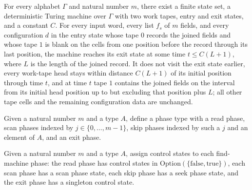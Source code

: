 \begin{theorem}
\label{Turing.exists_fieldsCopyTM}
\leanok
{}
For every alphabet $\Gamma$ and natural number $m$, there exist a finite state set, a
deterministic Turing machine over $\Gamma$ with two work tapes, entry and exit states,
and a constant $C$. For every input word, every list $f_s$ of $m$ fields, and every
configuration $d$ in the entry state whose tape $0$ records the joined fields and whose
tape $1$ is blank on the cells from one position before the record through its last
position, the machine reaches its exit state at some time $t \le C(L+1)$, where $L$ is
the length of the joined record. It does not visit the exit state earlier, every
work-tape head stays within distance $C(L+1)$ of its initial position through time $t$,
and at time $t$ tape $1$ contains the joined fields on the interval from its initial
head position up to but excluding that position plus $L$; all other tape cells and the
remaining configuration data are unchanged.
\end{theorem}

\begin{definition}
\label{Turing.rt_findPhase}
\leanok
Given a natural number $m$ and a type $A$, define a phase type with a read phase, scan
phases indexed by $j\in\{0,\ldots,m-1\}$, skip phases indexed by such a $j$ and an
element of $A$, and an exit phase.
\end{definition}

\begin{definition}
\label{Turing.rt_findControl}
\leanok
{}
Given a natural number $m$ and a type $A$, assign control states to each find-machine
phase: the read phase has control states in
$\mathrm{Option}(\{\mathrm{false},\mathrm{true}\})$, each scan phase has a scan phase
state, each skip phase has a seek phase state, and the exit phase has a singleton
control state.
\end{definition}

